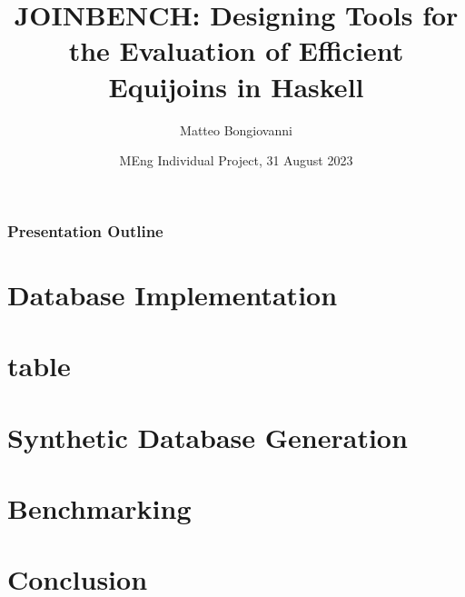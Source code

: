\documentclass{beamer}
\title[JOINBENCH]{JOINBENCH: Designing Tools for the Evaluation of Efficient Equijoins in Haskell}
\author{Matteo Bongiovanni}
\date{MEng Individual Project, 31 August 2023}
\institute[JMC]{Joint Mathematics and Computing \\ Department of Computing}
\begin{document}
\frame{\titlepage}

\begin{frame}
\frametitle{Presentation Outline}
\tableofcontents
\end{frame}

\section{Database Implementation}

\section{ table}

\section{Synthetic Database Generation}

\section{Benchmarking}

\section{Conclusion}
\end{document}
